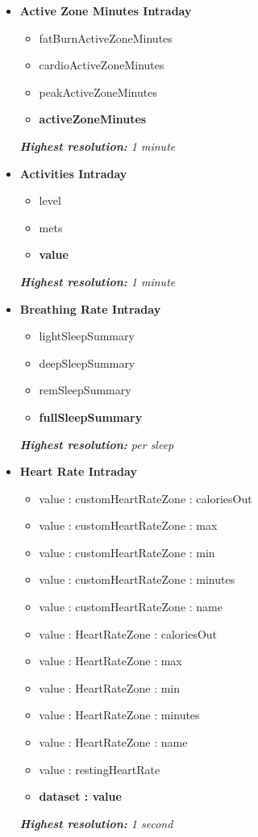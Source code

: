 \documentclass[a4paper, 12pt]{article}
\begin{document}
\begin{itemize}
    \item \textbf{Active Zone Minutes Intraday}
    \begin{itemize}
        \item fatBurnActiveZoneMinutes
        \item cardioActiveZoneMinutes
        \item peakActiveZoneMinutes
        \item \textbf{activeZoneMinutes}
    \end{itemize}
    \textit{\textbf{Highest resolution:} 1 minute}

    \item \textbf{Activities Intraday}
    \begin{itemize}
        \item level
        \item mets
        \item \textbf{value}
    \end{itemize}
    \textit{\textbf{Highest resolution:} 1 minute}

    \item \textbf{Breathing Rate Intraday}
    \begin{itemize}
        \item lightSleepSummary
        \item deepSleepSummary
        \item remSleepSummary
        \item \textbf{fullSleepSummary}
    \end{itemize}
    \textit{\textbf{Highest resolution:} per sleep}

    \item \textbf{Heart Rate Intraday}
    \begin{itemize}
        \item value : customHeartRateZone : caloriesOut
        \item value : customHeartRateZone : max
        \item value : customHeartRateZone : min
        \item value : customHeartRateZone : minutes
        \item value : customHeartRateZone : name
        \item value : HeartRateZone : caloriesOut
        \item value : HeartRateZone : max
        \item value : HeartRateZone : min
        \item value : HeartRateZone : minutes
        \item value : HeartRateZone : name
        \item value : restingHeartRate
        \item \textbf{dataset : value}
    \end{itemize}
    \textit{\textbf{Highest resolution:} 1 second}


\end{itemize}
\end{document}
